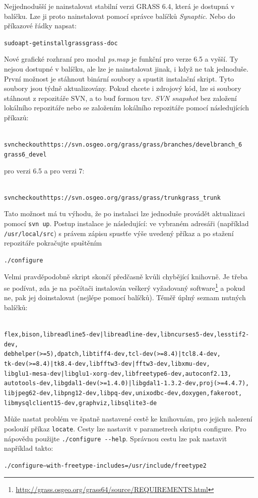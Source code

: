 \documentclass[a4paper,12pt,draft]{article}
\newcommand{\modul}[1]{\emph{#1}}
\begin{document}
Nejjednodušší je nainstalovat stabilní verzi GRASS 6.4, která je
dostupná v balíčku. Lze ji proto nainstalovat pomocí správce balíčků
\emph{Synaptic}. Nebo do příkazové řádky napsat:
\begin{alltt}
{\footnotesize sudo apt-get install grass grass-doc}
\end{alltt}

Nové grafické rozhraní pro modul \modul{ps.map} je funkční pro verze 6.5
a vyšší. Ty nejsou dostupné v balíčku, ale lze je nainstalovat jinak,
i když ne tak jednoduše. První možnost je stáhnout binární soubory  a
spustit instalační skript. Tyto soubory jsou týdně aktualizovány. Pokud
chcete i zdrojový kód, lze si soubory stáhnout z repozitáře SVN, a to buď
formou tzv. \emph{SVN snapshot} bez založení lokálního repozitáře nebo
se založením lokálního repozitáře pomocí následujících příkazů:
\begin{alltt}
{\footnotesize
svn checkout https://svn.osgeo.org/grass/grass/branches/develbranch_6
grass6_devel}
\end{alltt}
pro verzi 6.5 a pro verzi 7:
\begin{alltt}
{\footnotesize
svn checkout https://svn.osgeo.org/grass/grass/trunk grass_trunk}
\end{alltt}
Tato možnost má tu výhodu, že po instalaci lze jednoduše provádět
aktualizaci pomocí \verb|svn up|. Postup instalace je následující: ve
vybraném adresáři (například \verb|/usr/local/src|) s právem zápisu
spustťe výše uvedený příkaz a po stažení repozitáře pokračujte
spuštěním
\begin{alltt}
{\footnotesize ./configure}
\end{alltt}
Velmi pravděpodobně skript skončí předčasně
kvůli chybějící knihovně. Je třeba se podívat,
zda je na počítači instalován veškerý vyžadovaný
software\footnote{\url{http://grass.osgeo.org/grass64/source/REQUIREMENTS.html}}
a pokud ne, pak jej doinstalovat (nejlépe pomocí balíčků). Téměř
úplný seznam nutných balíčků:
\begin{alltt}
{\footnotesize
flex, bison, libreadline5-dev | libreadline-dev, libncurses5-dev, lesstif2-dev,
debhelper (>= 5), dpatch, libtiff4-dev, tcl-dev (>= 8.4) | tcl8.4-dev,
tk-dev (>= 8.4) | tk8.4-dev, libfftw3-dev|fftw3-dev, libxmu-dev,
libglu1-mesa-dev | libglu1-xorg-dev, libfreetype6-dev, autoconf2.13,
autotools-dev, libgdal1-dev (>=1.4.0) | libgdal1-1.3.2-dev, proj (>= 4.4.7),
libjpeg62-dev, libpng12-dev, libpq-dev, unixodbc-dev, doxygen, fakeroot,
libmysqlclient15-dev, graphviz, libsqlite3-de
}
\end{alltt}
Může nastat problém ve špatně nastavené cestě ke knihovnám, pro
jejich nalezení poslouží příkaz \verb|locate|. Cesty lze nastavit v
parametrech skriptu configure.
Pro nápovědu použijte \verb|./configure --help|.
Správnou cestu lze pak nastavit například takto:
\begin{alltt}
{\footnotesize./configure --with-freetype-includes=/usr/include/freetype2   }
\end{alltt}
\end{document}

